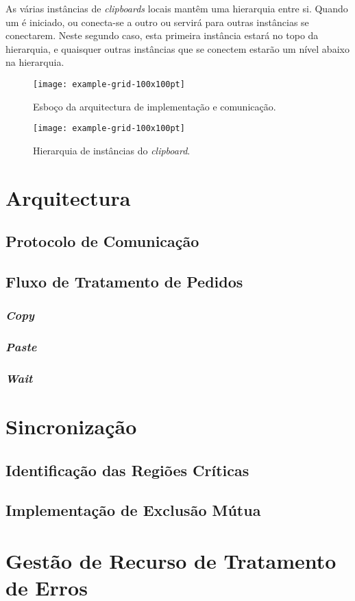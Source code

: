 \documentclass{article}
\begin{document}
As várias instâncias de \textit{clipboards} locais mantêm uma hierarquia
entre si. Quando um  é iniciado, ou conecta-se a outro ou
servirá para outras instâncias se conectarem. Neste segundo caso, esta
primeira instância estará no topo da hierarquia, e quaisquer outras
instâncias que se conectem estarão um nível abaixo na hierarquia.

\begin{figure}[ht]
	\centering
	\texttt{[image: example-grid-100x100pt]}
	\caption{Esboço da arquitectura de implementação e comunicação.}
	\label{fig:scheme_main}
\end{figure}

\begin{figure}[ht]
	\centering
	\texttt{[image: example-grid-100x100pt]}
	\caption{Hierarquia de instâncias do \textit{clipboard}.}
	\label{fig:hierarchy}
\end{figure}

\section{Arquitectura}

\subsection{Protocolo de Comunicação}

\subsection{Fluxo de Tratamento de Pedidos}

\subsubsection{\textit{Copy}}

\subsubsection{\textit{Paste}}

\subsubsection{\textit{Wait}}

\section{Sincronização}

\subsection{Identificação das Regiões Críticas}

\subsection{Implementação de Exclusão Mútua}

\section{Gestão de Recurso de Tratamento de Erros}
\end{document}
